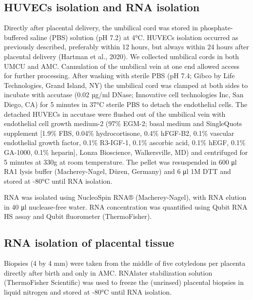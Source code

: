 \documentclass[authordate, empirical]{jote-new-article}
\begin{document}
\subsection{HUVECs isolation and RNA isolation }



Directly after placental delivery, the umbilical cord was stored in phosphate-buffered saline (PBS) solution (pH 7.2) at 4°C. HUVECs isolation occurred as previously described, preferably within 12 hours, but always within 24 hours after placental delivery (Hartman et al., 2020). We collected umbilical cords in both UMCU and AMC. Cannulation of the umbilical vein at one end allowed access for further processing. After washing with sterile PBS (pH 7.4; Gibco by Life Technologies, Grand Island, NY) the umbilical cord was clamped at both sides to incubate with accutase (0.02 µg/ml DNase; Innovative cell technologies Inc, San Diego, CA) for 5 minutes in 37°C sterile PBS to detach the endothelial cells. The detached HUVECs in accutase were flushed out of the umbilical vein with endothelial cell growth medium-2 (97\% EGM-2; basal medium and SingleQuots supplement [1.9\% FBS, 0.04\% hydrocortisone, 0.4\% hFGF-B2, 0.1\% vascular endothelial growth factor, 0.1\% R3-IGF-1, 0.1\% ascorbic acid, 0.1\% hEGF, 0.1\% GA-1000, 0.1\% heparin], Lonza Bioscience, Walkersville, MD) and centrifuged for 5 minutes at 330g at room temperature. The pellet was resuspended in 600 μl RA1 lysis buffer (Macherey-Nagel, Düren, Germany) and 6 μl 1M DTT and stored at -80°C until RNA isolation.



RNA was isolated using NucleoSpin RNA® (Macherey-Nagel), with RNA elution in 40 μl nuclease-free water. RNA concentration was quantified using Qubit RNA HS assay and Qubit fluorometer (ThermoFisher).







\subsection{RNA isolation of placental tissue}



Biopsies (4 by 4 mm) were taken from the middle of five cotyledons per placenta directly after birth and only in AMC. RNAlater stabilization solution (ThermoFisher Scientific) was used to freeze the (unrinsed) placental biopsies in liquid nitrogen and stored at -80°C until RNA isolation.
\end{document}
